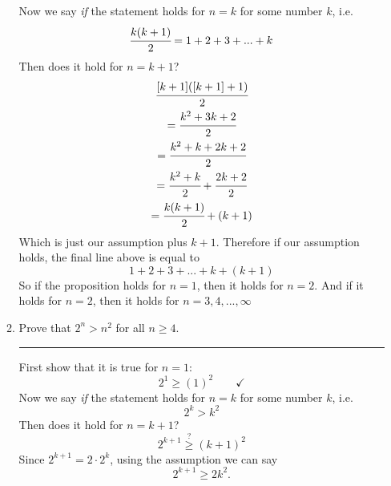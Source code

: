 \documentclass[10pt,a4paper]{article}
\begin{document}
\begin{itemize}
\begin{enumerate}
                 Now we say \textit{if} the statement holds for $n=k$ for some number $k$, i.e.
                \begin{equation}
                   \cfrac{k(k+1)}{2} = 1+2+3+...+k
                \end{equation}
                Then does it hold for $n=k+1$?
                    \begin{gather}
                        \cfrac{[k+1]([k+1]+1)}{2} \\
                        = \cfrac{k^2+3k+2}{2} \\
                        = \cfrac{k^2+k+2k+2}{2} \\
                        = \cfrac{k^2+k}{2} + \cfrac{2k+2}{2} \\
                        = \cfrac{k(k+1)}{2} + (k+1)
                    \end{gather}
                Which is just our assumption plus $k+1$. Therefore if our assumption holds, the final line above is equal to 
                \begin{equation}
                    1+2+3+...+k+(k+1)
                \end{equation}
                So if the proposition holds for $n=1$, then it holds for $n=2$. And if it holds for $n=2$, then it holds for $n=3,4,...,\infty$ \quad \qedsymbol
%           
            \item \textcolor{gren2}{Prove} that $2^n > n^2$ for all $n\geq 4{}$. \\
            \rule{\linewidth}{0.1mm}
                First show that it is true for $n=1$:
                \begin{equation}
                    2^1 \geq (1)^2 \qquad \checkmark
                \end{equation}
                Now we say \textit{if} the statement holds for $n=k$ for some number $k$, i.e.
                \begin{equation}
                   2^k > k^2
                \end{equation}
                Then does it hold for $n=k+1$?
                \begin{equation}
                    2^{k+1} \stackrel{?}{\geq} (k+1)^2
                \end{equation}
                Since $2^{k+1}=2\cdot 2^k$, using the assumption we can say
                \begin{equation}
                    2^{k+1} \geq 2k^2.
                \end{equation}

\end{enumerate}
\end{itemize}
\end{document}
